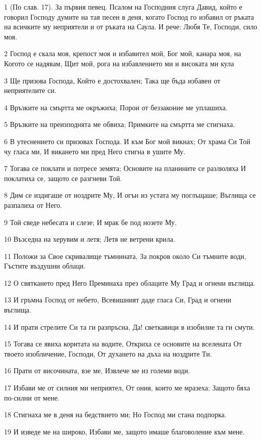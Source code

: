\par 1 (По слав. 17). За първия певец. Псалом на Господния слуга Давид, който е говорил Господу думите на тая песен в деня, когато Господ го избавил от ръката на всичките му неприятели и от ръката на Саула. И рече: Любя Те, Господи, сило моя.
\par 2 Господ е скала моя, крепост моя и избавител мой, Бог мой, канара моя, на Когото се надявам, Щит мой, рога на избавлението ми и високата ми кула
\par 3 Ще призова Господа, Който е достохвален; Така ще бъда избавен от неприятелите си.
\par 4 Връзките на смъртта ме окръжиха; Порои от беззаконие ме уплашиха.
\par 5 Връзките на преизподнята ме обвиха; Примките на смъртта ме стигнаха.
\par 6 В утеснението си призовах Господа. И към Бог мой викнах; От храма Си Той чу гласа ми, И викането ми пред Него стигна в ушите Му.
\par 7 Тогава се поклати и потресе земята; Основите на планините се разлюляха И поклатиха се, защото се разгневи Той.
\par 8 Дим се издигаше от ноздрите Му, И огън из устата му поглъщаше; Въглища се разпалиха от Него.
\par 9 Той сведе небесата и слезе; И мрак бе под нозете Му.
\par 10 Възседна на херувим и летя; Летя не ветрени крила.
\par 11 Положи за Свое скривалище тъмнината, За покров около Си тъмните води, Гъстите въздушни облаци.
\par 12 О святкането пред Него Преминаха през облаците Му Град и огнени въглища.
\par 13 И гръмна Господ от небето, Всевишният даде гласа Си, Град и огнени въглища.
\par 14 И прати стрелите Си та ги разпръсна, Да! светкавици в изобилие та ги смути.
\par 15 Тогава се явиха коритата на водите, Откриха се основите на вселената От твоето изобличение, Господи, От духането на дъха на ноздрите Ти.
\par 16 Прати от височината, взе ме, Извлече ме из големи води.
\par 17 Избави ме от силния ми неприятел, От ония, които ме мразеха; Защото бяха по-силни от мене.
\par 18 Стигнаха ме в деня на бедствието ми; Но Господ ми стана подпорка.
\par 19 И изведе ме на широко, Избави ме, защото имаше благоволение към мене.
